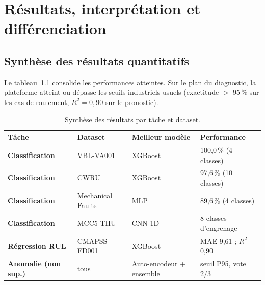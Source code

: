 \chapter{Résultats, interprétation et différenciation}
\label{chap:resultats}

\section{Synthèse des résultats quantitatifs}
Le tableau~\ref{tab:synth} consolide les performances atteintes. Sur le plan du diagnostic,
la plateforme atteint ou dépasse les seuils industriels usuels (exactitude $>$ 95\,\% sur les
cas de roulement, $R^2 = 0{,}90$ sur le pronostic).

\begin{table}[h]
\centering\small
\caption{Synthèse des résultats par tâche et dataset.}
\label{tab:synth}
\begin{tabular}{>{\bfseries}l l l l}
\toprule
Tâche & Dataset & Meilleur modèle & Performance \\
\midrule
Classification & VBL-VA001 & XGBoost & 100{,}0\,\% (4 classes) \\
Classification & CWRU & XGBoost & 97{,}6\,\% (10 classes) \\
Classification & Mechanical Faults & MLP & 89{,}6\,\% (4 classes) \\
Classification & MCC5-THU & CNN 1D & 8 classes d'engrenage \\
Régression RUL & CMAPSS FD001 & XGBoost & MAE 9{,}61 ; $R^2$ 0{,}90 \\
Anomalie (non sup.) & tous & Auto-encodeur + ensemble & seuil P95, vote 2/3 \\
\bottomrule
\end{tabular}
\end{table}

